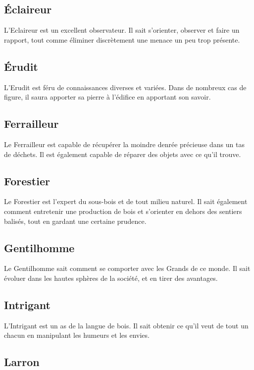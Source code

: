\documentclass[twoside,12pt,english]{book}
\begin{document}
\subsection*{Éclaireur}

L'Eclaireur est un excellent observateur. Il sait s'orienter, observer et faire un rapport, tout comme éliminer discrètement une menace un peu trop présente.

\subsection*{Érudit}

L'Erudit est féru de connaissances diverses et variées. Dans de nombreux cas de figure, il saura apporter sa pierre à l'édifice en apportant son savoir.

\subsection*{Ferrailleur}

Le Ferrailleur est capable de récupérer la moindre denrée précieuse dans un tas de déchets. Il est également capable de réparer des objets avec ce qu'il trouve.

\subsection*{Forestier}

Le Forestier est l'expert du sous-bois et de tout milieu naturel. Il sait également comment entretenir une production de bois et s'orienter en dehors des sentiers balisés, tout en gardant une certaine prudence.

\subsection*{Gentilhomme}

Le Gentilhomme sait comment se comporter avec les Grands de ce monde. Il sait évoluer dans les hautes sphères de la société, et en tirer des avantages.

\subsection*{Intrigant}

L'Intrigant est un as de la langue de bois. Il sait obtenir ce qu'il veut de tout un chacun en manipulant les humeurs et les envies.

\subsection*{Larron}
\end{document}
